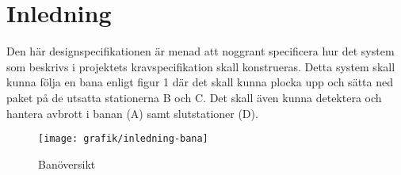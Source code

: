 \section{Inledning}
Den här designspecifikationen är menad att noggrant specificera hur det system som beskrivs i projektets kravspecifikation skall konstrueras. Detta system skall kunna följa en bana enligt figur 1 där det skall kunna plocka upp och sätta ned paket på de utsatta stationerna B och C. Det skall även kunna detektera och hantera avbrott i banan (A) samt slutstationer (D).

\begin{figure}[h]
\center
\texttt{[image: grafik/inledning-bana]}
\caption{Banöversikt} \label{systemskiss:banoversikt}
\end{figure}
